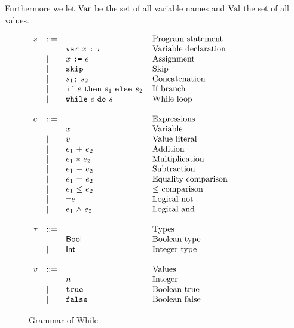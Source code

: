 Furthermore we let $\mbox{$\mathrm{Var}$}$ be the set of all variable names and $\mbox{$\mathrm{Val}$}$ the
set of all values.

\begin{figure}[h]
  \centering
  $\begin{array}{lll@{\hspace{4mm}}l}
    s &::= & & \mbox{Program statement} \\
    &  & \WhDecl{x}{\tau} & \mbox{Variable declaration} \\
    &| & \WhAssign{x}{e} & \mbox{Assignment} \\
    &| & \WhSkip & \mbox{Skip} \\
    &| & \WhConc{s_1}{s_2} & \mbox{Concatenation} \\
    &| & \WhIf{e}{s_1}{s_2} & \mbox{If branch} \\
    &| & \WhWhile{e}{s} & \mbox{While loop} \\
    &&&\\
    e & ::= & & \mbox{Expressions} \\
    & & x & \mbox{Variable} \\
    &| & v & \mbox{Value literal} \\
    &| & \WhAdd{e_1}{e_2} & \mbox{Addition} \\
    &| & \WhTimes{e_1}{e_2} & \mbox{Multiplication} \\
    &| & \WhMinus{e_1}{e_2} & \mbox{Subtraction} \\
    &| & \WhEq{e_1}{e_2} & \mbox{Equality comparison} \\
    &| & \WhLeq{e_1}{e_2} & \mbox{$\leq$ comparison} \\
    &| & \WhLnot{e} & \mbox{Logical not} \\
    &| & \WhLand{e_1}{e_2} & \mbox{Logical and} \\
    &&&\\
    \tau & ::= & & \mbox{Types} \\
    & & \WhBool & \mbox{Boolean type} \\
    &| & \WhInt & \mbox{Integer type} \\
    &&&\\
    v & ::= & & \mbox{Values} \\
    &  & n & \mbox{Integer} \\
    &| & \WhTrue & \mbox{Boolean true} \\
    &| & \WhFalse & \mbox{Boolean false} \\
  \end{array}$
  \caption{Grammar of While}
  \label{fig:while_grammar}
\end{figure}

